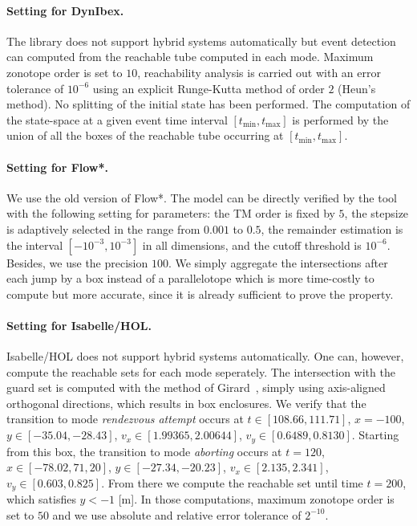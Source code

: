 \documentclass[EPiC]{easychair}
\begin{document}
\paragraph{Setting for DynIbex.}
The library does not support hybrid systems automatically but event detection can computed from the reachable tube computed in each mode. Maximum zonotope order is set to $10$, reachability analysis is carried out with an error tolerance of $10^{-6}$ using an explicit Runge-Kutta method of order $2$ (Heun's method). No splitting of the initial state has been performed. The computation of the state-space at a given event time interval $[t_{\min}, t_{\max}]$ is performed by the union of all the boxes of the reachable tube occurring at $[t_{\min}, t_{\max}]$.

\paragraph{Setting for Flow*.}
We use the old version of Flow*. The model can be directly verified by the tool with the following setting for parameters: the TM order is fixed by $5$, the stepsize is adaptively selected in the range from $0.001$ to $0.5$, the remainder estimation is the interval $[-10^{-3},10^{-3}]$ in all dimensions, and the cutoff threshold is $10^{-6}$. Besides, we use the precision $100$. We simply aggregate the intersections after each jump by a box instead of a parallelotope which is more time-costly to compute but more accurate, since it is already sufficient to prove the property.

\paragraph{Setting for Isabelle/HOL.}
Isabelle/HOL does not support hybrid systems automatically.
One can, however, compute the reachable sets for each mode seperately. The intersection with the guard set is computed with the method of Girard~\cite{Girard2008}, simply using axis-aligned orthogonal directions, which results in box enclosures. We verify that the transition to mode \emph{rendezvous attempt} occurs at
$t \in [108.66, 111.71]$,
$x = -100$,
$y \in [-35.04, -28.43]$,
$v_x \in [1.99365, 2.00644]$,
$v_y \in [0.6489, 0.8130]$. Starting from this box, the transition to mode \emph{aborting} occurs at
$t = 120$,
$x \in [-78.02, 71,20]$,
$y \in [-27.34, -20.23]$,
$v_x \in [2.135, 2.341]$,
$v_y \in [0.603, 0.825]$. From there we compute the reachable set until time $t = 200$, which satisfies $y < -1$ [m].
In those computations, maximum zonotope order is set to $50$ and we use absolute and relative error tolerance of $2^{-10}$.
\end{document}
